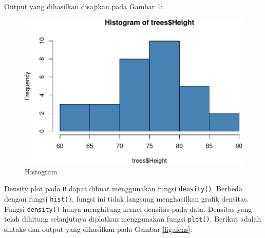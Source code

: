 \documentclass[]{book}
\newenvironment{Shaded}{\begin{snugshade}}{\end{snugshade}}
\newcommand{\KeywordTok}[1]{\textcolor[rgb]{0.13,0.29,0.53}{\textbf{#1}}}
\newcommand{\DataTypeTok}[1]{\textcolor[rgb]{0.13,0.29,0.53}{#1}}
\newcommand{\StringTok}[1]{\textcolor[rgb]{0.31,0.60,0.02}{#1}}
\newcommand{\CommentTok}[1]{\textcolor[rgb]{0.56,0.35,0.01}{\textit{#1}}}
\newcommand{\OperatorTok}[1]{\textcolor[rgb]{0.81,0.36,0.00}{\textbf{#1}}}
\newcommand{\NormalTok}[1]{#1}
\begin{document}
\begin{Shaded}
\end{Shaded}

Output yang dihasilkan disajikan pada Gambar \ref{fig:hist}:

\begin{figure}

{\centering \includegraphics[width=0.7\linewidth]{EnvStat_files/figure-latex/hist-1} 

}

\caption{Histogram}\label{fig:hist}
\end{figure}

Density plot pada \texttt{R} dapat dibuat menggunakan fungsi
\texttt{density()}. Berbeda dengan fungsi \texttt{hist()}, fungsi ini
tidak langsung menghasilkan grafik densitas. Fungsi \texttt{density()}
hanya menghitung kernel densitas pada data. Densitas yang telah dihitung
selanjutnya diplotkan menggunakan fungsi \texttt{plot()}. Berikut adalah
sintaks dan output yang dihasilkan pada Gambar \ref{fig:dens}:

\begin{Shaded}
\end{Shaded}
\end{document}
